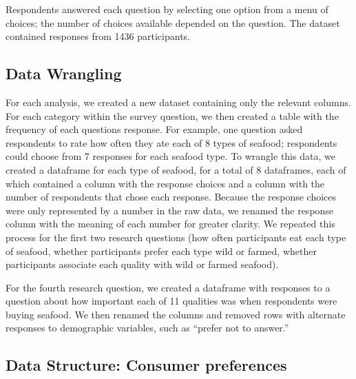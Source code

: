 \documentclass[
  12pt,
]{article}
\begin{document}
Respondents answered each question by selecting one option from a menu
of choices; the number of choices available depended on the question.
The dataset contained responses from 1436 participants.

\hypertarget{data-wrangling}{%
\subsection{Data Wrangling}\label{data-wrangling}}

For each analysis, we created a new dataset containing only the relevant
columns. For each category within the survey question, we then created a
table with the frequency of each questions response. For example, one
question asked respondents to rate how often they ate each of 8 types of
seafood; respondents could choose from 7 responses for each seafood
type. To wrangle this data, we created a dataframe for each type of
seafood, for a total of 8 dataframes, each of which contained a column
with the response choices and a column with the number of respondents
that chose each response. Because the response choices were only
represented by a number in the raw data, we renamed the response column
with the meaning of each number for greater clarity. We repeated this
process for the first two research questions (how often participants eat
each type of seafood, whether participants prefer each type wild or
farmed, whether participants associate each quality with wild or farmed
seafood).

For the fourth research question, we created a dataframe with responses
to a question about how important each of 11 qualities was when
respondents were buying seafood. We then renamed the columns and removed
rows with alternate responses to demographic variables, such as ``prefer
not to answer.''

\hypertarget{data-structure-consumer-preferences}{%
\subsection{Data Structure: Consumer
preferences}\label{data-structure-consumer-preferences}}
\end{document}
